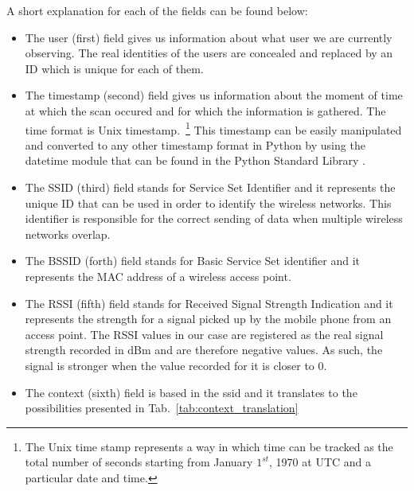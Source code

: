 A short explanation for each of the fields can be found below:
\begin{itemize}
\item The user (first) field gives us information about what user we are
currently observing. The real identities of the users are concealed and replaced by an ID
which is unique for each of them.
\item The timestamp (second) field gives us information about the moment of time
at which the scan occured and for which the information is gathered. The time
format is Unix timestamp.~\footnote{The Unix time stamp represents a way in
which time can be tracked as the total number of seconds starting from January
$1^{st}$, 1970 at UTC and a particular date and time.} This timestamp can be
easily manipulated and converted to any other timestamp format in Python by
using the datetime module that can be found in the Python Standard Library
\cite{PSL}.
\item The SSID (third) field stands for Service Set Identifier and it represents
the unique ID that can be used in order to identify the wireless networks. This
identifier is responsible for the correct sending of data when multiple wireless
networks overlap.
\item The BSSID (forth) field stands for Basic Service Set identifier and it
represents the MAC address of a wireless access point.
\item The RSSI (fifth) field stands for Received Signal Strength Indication and
it represents the strength for a signal picked up by the mobile phone from an
access point. The RSSI values in our case are registered as the real signal
strength recorded in dBm and are therefore negative values. As such, the signal
is stronger when the value recorded for it is closer to $0$.
\item The context (sixth) field is based in the ssid and it translates to the
possibilities presented in Tab.~\ref{tab:context_translation}
\end{itemize}

